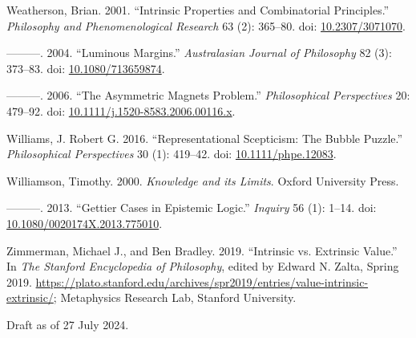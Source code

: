 \documentclass[
  10pt,
  letterpaper,
  DIV=11,
  numbers=noendperiod,
  twoside]{scrartcl}
\newlength{\cslhangindent}
\newenvironment{CSLReferences}[2] %
 {\begin{list}{}{%
  \setlength{\itemindent}{0pt}
  \setlength{\leftmargin}{0pt}
  \setlength{\parsep}{0pt}
  \ifodd #1
   \setlength{\leftmargin}{\cslhangindent}
   \setlength{\itemindent}{-1\cslhangindent}
  \fi
  \setlength{\itemsep}{#2\baselineskip}}}
 {\end{list}}
\begin{document}
\begin{CSLReferences}{1}{0}
Weatherson, Brian. 2001. {``{Intrinsic Properties and Combinatorial
Principles}.''} \emph{Philosophy and Phenomenological Research} 63 (2):
365--80. doi: \href{https://doi.org/10.2307/3071070}{10.2307/3071070}.

---------. 2004. {``Luminous Margins.''} \emph{Australasian Journal of
Philosophy} 82 (3): 373--83. doi:
\href{https://doi.org/10.1080/713659874}{10.1080/713659874}.

---------. 2006. {``{The Asymmetric Magnets Problem}.''}
\emph{Philosophical Perspectives} 20: 479--92. doi:
\href{https://doi.org/10.1111/j.1520-8583.2006.00116.x}{10.1111/j.1520-8583.2006.00116.x}.

Williams, J. Robert G. 2016. {``Representational Scepticism: The Bubble
Puzzle.''} \emph{Philosophical Perspectives} 30 (1): 419--42. doi:
\href{https://doi.org/10.1111/phpe.12083}{10.1111/phpe.12083}.

Williamson, Timothy. 2000. \emph{{Knowledge and its Limits}}. Oxford
University Press.

---------. 2013. {``Gettier Cases in Epistemic Logic.''} \emph{Inquiry}
56 (1): 1--14. doi:
\href{https://doi.org/10.1080/0020174X.2013.775010}{10.1080/0020174X.2013.775010}.

Zimmerman, Michael J., and Ben Bradley. 2019. {``{Intrinsic vs.
Extrinsic Value}.''} In \emph{The {Stanford} Encyclopedia of
Philosophy}, edited by Edward N. Zalta, {S}pring 2019.
\url{https://plato.stanford.edu/archives/spr2019/entries/value-intrinsic-extrinsic/};
Metaphysics Research Lab, Stanford University.

\end{CSLReferences}



\noindent Draft as of 27 July 2024.
\end{document}
